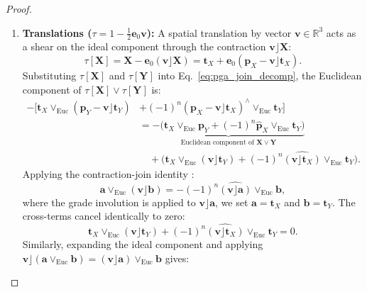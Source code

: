 \documentclass[10pt]{article}
\begin{document}
\begin{proof}
\begin{enumerate}
    \item \textbf{Translations ($\tau = 1 - \frac{1}{2}\mathbf{e}_0 \mathbf{v}$):}
    A spatial translation by vector $\mathbf{v} \in \mathbb{R}^3$ acts as a shear on the ideal component through the contraction $\mathbf{v} \rfloor \mathbf{X}$:
    \begin{equation}
        \tau[\mathbf{X}] = \mathbf{X} - \mathbf{e}_0 (\mathbf{v} \rfloor \mathbf{X}) = \mathbf{t}_X + \mathbf{e}_0 (\mathbf{p}_X - \mathbf{v} \rfloor \mathbf{t}_X).
    \end{equation}
    Substituting $\tau[\mathbf{X}]$ and $\tau[\mathbf{Y}]$ into Eq.~\ref{eq:pga_join_decomp}, the Euclidean component of $\tau[\mathbf{X}] \vee \tau[\mathbf{Y}]$ is:
    \begin{align}
        -\Big[ \mathbf{t}_X \vee_{\mathrm{Euc}} (\mathbf{p}_Y - \mathbf{v} \rfloor \mathbf{t}_Y) &+ (-1)^n (\mathbf{p}_X - \mathbf{v} \rfloor \mathbf{t}_X)^\wedge \vee_{\mathrm{Euc}} \mathbf{t}_Y \Big] \nonumber \\
        &= \underbrace{-\Big( \mathbf{t}_X \vee_{\mathrm{Euc}} \mathbf{p}_Y + (-1)^n \hat{\mathbf{p}}_X \vee_{\mathrm{Euc}} \mathbf{t}_Y \Big)}_{\text{Euclidean component of } \mathbf{X} \vee \mathbf{Y}} \nonumber \\
        &\quad + \Big( \mathbf{t}_X \vee_{\mathrm{Euc}} (\mathbf{v} \rfloor \mathbf{t}_Y) + (-1)^n \widehat{(\mathbf{v} \rfloor \mathbf{t}_X)} \vee_{\mathrm{Euc}} \mathbf{t}_Y \Big).
    \end{align}
    Applying the contraction-join identity \citep[Lemma~6, Eq.~9]{gatr}:
    \begin{equation}
        \mathbf{a} \vee_{\mathrm{Euc}} (\mathbf{v} \rfloor \mathbf{b}) = -(-1)^n \widehat{(\mathbf{v} \rfloor \mathbf{a})} \vee_{\mathrm{Euc}} \mathbf{b},
        \label{eq:gatr_lemma6}
    \end{equation}
    where the grade involution is applied to $\mathbf{v} \rfloor \mathbf{a}$, we set $\mathbf{a} = \mathbf{t}_X$ and $\mathbf{b} = \mathbf{t}_Y$. The cross-terms cancel identically to zero:
    \begin{equation}
        \mathbf{t}_X \vee_{\mathrm{Euc}} (\mathbf{v} \rfloor \mathbf{t}_Y) + (-1)^n \widehat{(\mathbf{v} \rfloor \mathbf{t}_X)} \vee_{\mathrm{Euc}} \mathbf{t}_Y = 0.
    \end{equation}
    Similarly, expanding the ideal component and applying $\mathbf{v} \rfloor (\mathbf{a} \vee_{\mathrm{Euc}} \mathbf{b}) = (\mathbf{v} \rfloor \mathbf{a}) \vee_{\mathrm{Euc}} \mathbf{b}$ \citep[Lemma~6, Eq.~8]{gatr} gives:

\end{enumerate}
\end{proof}
\end{document}
